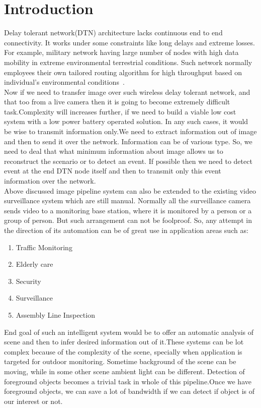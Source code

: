 
\chapter{Introduction} %
\label{Chapter1}

Delay tolerant network(DTN) architecture lacks continuous end to end
connectivity. It works under some constraints like long delays and
extreme losses. For example, military network having large number of
nodes with high data mobility in extreme environmental terrestrial
conditions. Such network normally employees their own tailored routing
algorithm for high throughput based on individual's environmental
conditions~\cite{1}.\\

Now if we need to transfer image over such wireless delay tolerant
network, and that too from a live camera then it is going to become
extremely difficult task.Complexity will increases further, if we need
to build a viable low cost system with a low power battery operated
solution.  In any such cases, it would be wise to transmit
information only.We need to extract information out of image and then to
send it over the network.  Information can be of various type. So, we
need to deal that what minimum information about image allows us to
reconstruct the scenario or to detect an event. If possible then we 
need to detect event at the end DTN node itself and then to transmit
only this event information over the network.\\

Above discussed image pipeline system can also be extended to
the existing video surveillance system which are still manual. Normally
all the surveillance camera sends video to a monitoring base station,
where it is monitored by a person or a group of person. But such
arrangement can not be foolproof. So, any attempt in the direction of
its automation can be of great use in application areas such as:
\begin{enumerate}
 \item  Traffic Monitoring
  \item Elderly care
  \item Security
  \item Surveillance
  \item Assembly Line Inspection
\end{enumerate}
End goal of such an intelligent system would be to offer an
automatic analysis of scene and then to infer desired information out of
it.These systems can be lot complex because of the complexity of the
scene, specially when application is targeted for outdoor monitoring.
Sometime background of the scene can be moving, while in some
other scene ambient light can be different. Detection of foreground
objects becomes a trivial task in whole of this pipeline.Once we have
foreground objects, we can save a lot of bandwidth if we can detect if
object is of our interest or not.\\

